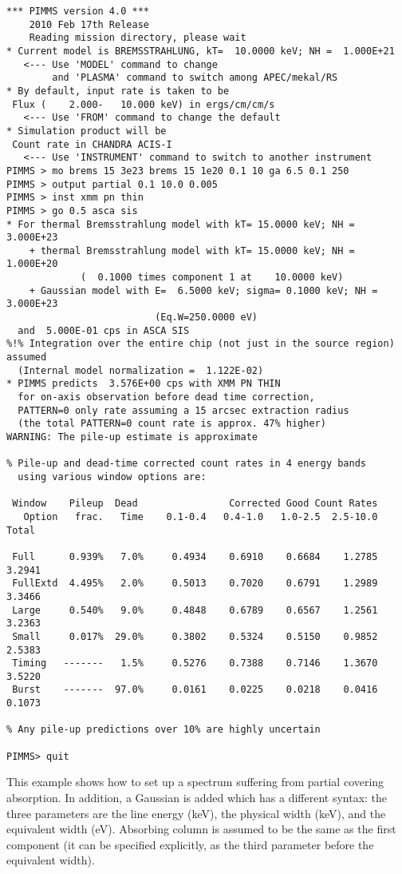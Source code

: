 \begin{verbatim}
*** PIMMS version 4.0 ***
    2010 Feb 17th Release
    Reading mission directory, please wait
* Current model is BREMSSTRAHLUNG, kT=  10.0000 keV; NH =  1.000E+21
   <--- Use 'MODEL' command to change
        and 'PLASMA' command to switch among APEC/mekal/RS
* By default, input rate is taken to be
 Flux (    2.000-   10.000 keV) in ergs/cm/cm/s
   <--- Use 'FROM' command to change the default
* Simulation product will be
 Count rate in CHANDRA ACIS-I
   <--- Use 'INSTRUMENT' command to switch to another instrument
PIMMS > mo brems 15 3e23 brems 15 1e20 0.1 10 ga 6.5 0.1 250
PIMMS > output partial 0.1 10.0 0.005
PIMMS > inst xmm pn thin
PIMMS > go 0.5 asca sis
* For thermal Bremsstrahlung model with kT= 15.0000 keV; NH =  3.000E+23
    + thermal Bremsstrahlung model with kT= 15.0000 keV; NH =  1.000E+20
             (  0.1000 times component 1 at    10.0000 keV)
    + Gaussian model with E=  6.5000 keV; sigma= 0.1000 keV; NH =  3.000E+23
                          (Eq.W=250.0000 eV)
  and  5.000E-01 cps in ASCA SIS
%!% Integration over the entire chip (not just in the source region) assumed
  (Internal model normalization =  1.122E-02)
* PIMMS predicts  3.576E+00 cps with XMM PN THIN
  for on-axis observation before dead time correction,
  PATTERN=0 only rate assuming a 15 arcsec extraction radius
  (the total PATTERN=0 count rate is approx. 47% higher)
WARNING: The pile-up estimate is approximate

% Pile-up and dead-time corrected count rates in 4 energy bands
  using various window options are:

 Window    Pileup  Dead                Corrected Good Count Rates
   Option   frac.   Time    0.1-0.4   0.4-1.0   1.0-2.5  2.5-10.0     Total

 Full      0.939%   7.0%     0.4934    0.6910    0.6684    1.2785      3.2941
 FullExtd  4.495%   2.0%     0.5013    0.7020    0.6791    1.2989      3.3466
 Large     0.540%   9.0%     0.4848    0.6789    0.6567    1.2561      3.2363
 Small     0.017%  29.0%     0.3802    0.5324    0.5150    0.9852      2.5383
 Timing   -------   1.5%     0.5276    0.7388    0.7146    1.3670      3.5220
 Burst    -------  97.0%     0.0161    0.0225    0.0218    0.0416      0.1073

% Any pile-up predictions over 10% are highly uncertain

PIMMS> quit
\end{verbatim}

This example shows how to set up a spectrum suffering from partial
covering absorption.  In addition, a Gaussian is added which has
a different syntax: the three parameters are the line energy (keV),
the physical width (keV), and the equivalent width (eV).  Absorbing
column is assumed to be the same as the first component (it can
be specified explicitly, as the third parameter before the equivalent
width).

